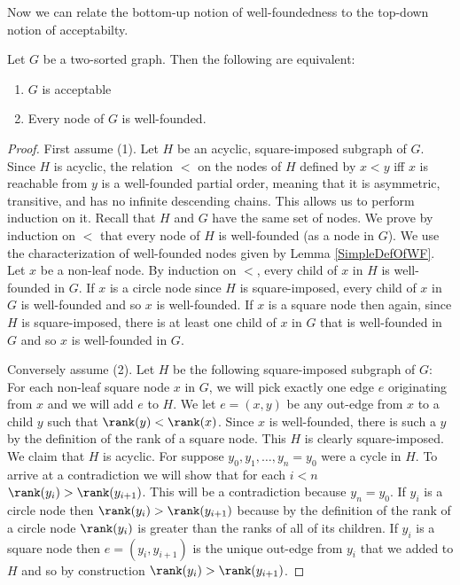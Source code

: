 \documentclass[oneside,12pt]{amsart}
\begin{document}
Now we can relate the bottom-up notion of well-foundedness to the top-down notion of acceptabilty.


\begin{theorem}
\label{MainEquivalence}
Let $G$ be a two-sorted graph. Then the following are equivalent:
\begin{enumerate}
\item $G$ is acceptable
\item Every node of $G$ is well-founded.
\end{enumerate}
\end{theorem}
\begin{proof}
First assume (1). Let $H$ be an acyclic, square-imposed subgraph of $G$. Since $H$ is acyclic, the
relation $<$ on the nodes of $H$ defined by $x<y$ iff $x$ is reachable from $y$
is a well-founded partial order, meaning that it is asymmetric,
transitive, and has no infinite descending chains. This allows us to perform induction on it.
Recall that $H$ and $G$ have the same set of nodes.
We prove by induction on $<$ that every node of $H$ is well-founded (as a node in $G$).
We use the characterization of well-founded nodes given by Lemma \ref{SimpleDefOfWF}.
Let $x$ be a non-leaf node.
By induction on $<$, every child of $x$ in $H$ is well-founded in $G$.
If $x$ is a circle node since $H$ is
square-imposed, every child of $x$ in $G$ is well-founded and so $x$ is well-founded.
If $x$ is a square node then again, since $H$ is square-imposed,
there is at least one child of $x$ in $G$ that is well-founded in $G$ and so $x$ is well-founded in $G$.

Conversely assume (2). Let $H$ be the following square-imposed subgraph of $G$:
For each non-leaf square node $x$ in $G$, we will pick exactly one edge $e$ originating
from $x$ and we will add $e$ to $H$. We let $e = (x, y)$ be any out-edge from $x$ to a child $y$
such that $\rank(y)<\rank(x)$. Since $x$ is well-founded, there is such a $y$ by the definition of the rank of a square node.
This $H$ is clearly square-imposed. We claim that $H$ is acyclic. For suppose
$y_0, y_1,\dots,y_n=y_0$ were a cycle in $H$. To arrive at a contradiction we will show that for each $i<n$
$\rank(y_i)>\rank(y_{i+1})$. This will be a contradiction because $y_n=y_0$. If $y_i$ is a circle node then
$\rank(y_i)>\rank(y_{i+1})$ because by the definition of the rank of a circle node $\rank(y_i)$ is greater than the
ranks of all of its children. If $y_i$ is a square node then $e=(y_i,y_{i+1} )$ is the unique out-edge from $y_i$ that
we added to $H$ and so by construction $\rank(y_i)>\rank(y_{i+1})$.
\end{proof}
\end{document}

